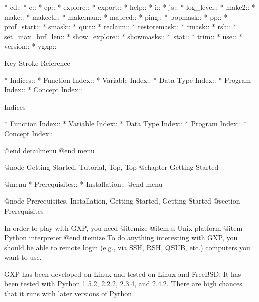 * cd::                          
* e::                           
* ep::                          
* explore::                     
* export::                      
* help::                        
* i::                           
* js::                          
* log_level::                   
* make2::                       
* make::                        
* makectl::                     
* makeman::                     
* mapred::                      
* ping::                        
* popmask::                     
* pp::                          
* prof_start::                  
* smask::                       
* quit::                        
* reclaim::                     
* restoremask::                 
* rmask::                       
* rsh::                         
* set_max_buf_len::             
* show_explore::                
* showmasks::                   
* stat::                        
* trim::                        
* use::                         
* version::                     
* vgxp::                        

Key Stroke Reference

* Indices::                     
* Function Index::              
* Variable Index::              
* Data Type Index::             
* Program Index::               
* Concept Index::               

Indices

* Function Index::              
* Variable Index::              
* Data Type Index::             
* Program Index::               
* Concept Index::               

@end detailmenu
@end menu

@node Getting Started, Tutorial, Top, Top
@chapter Getting Started


@menu
* Prerequisites::               
* Installation::                
@end menu

@node Prerequisites, Installation, Getting Started, Getting Started
@section Prerequisites

In order to play with GXP, you need
@itemize
@item a Unix platform
@item Python interpreter
@end itemize
To do anything interesting with GXP, you should be able to remote
login (e.g., via SSH, RSH, QSUB, etc.) computers you want to use.

GXP has been developed on Linux and tested on Linux and FreeBSD.  It
has been tested with Python 1.5.2, 2.2.2, 2.3.4, and 2.4.2.  There are
high chances that it runs with later versions of Python.

